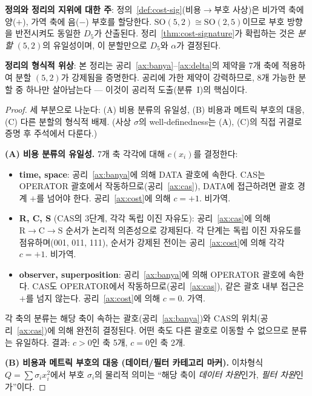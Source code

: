 \documentclass[entropy,article,submit,pdftex,oneauthor]{Definitions/mdpi}
\begin{document}
\textbf{정의와 정리의 지위에 대한 주}: 정의~\ref{def:cost-sig}(비용$\to$부호 사상)은 비가역 축에 양($+$), 가역 축에 음($-$) 부호를 할당한다. $\mathrm{SO}(5,2) \cong \mathrm{SO}(2,5)$이므로 부호 방향을 반전시켜도 동일한 $D_5$가 산출된다. 정리~\ref{thm:cost-signature}가 확립하는 것은 \emph{분할} $(5,2)$의 유일성이며, 이 분할만으로 $D_5$와 $\alpha$가 결정된다.

\textbf{정리의 형식적 위상}: 본 정리는 공리~\ref{ax:banya}--\ref{ax:delta}의 제약을 7개 축에 적용하여 분할 $(5,2)$가 강제됨을 증명한다. 공리에 가한 제약이 강력하므로, 8개 가능한 분할 중 하나만 살아남는다 --- 이것이 공리적 도출(분류~I)의 핵심이다.

\begin{proof}
세 부분으로 나눈다: (A) 비용 분류의 유일성, (B) 비용과 메트릭 부호의 대응, (C) 다른 분할의 형식적 배제. (사상 $\sigma$의 well-definedness는 (A), (C)의 직접 귀결로 증명 후 주석에서 다룬다.)

\textbf{(A) 비용 분류의 유일성.} 7개 축 각각에 대해 $c(x_i)$를 결정한다:
\begin{itemize}
\item \textbf{time, space}: 공리~\ref{ax:banya}에 의해 DATA 괄호에 속한다. CAS는 OPERATOR 괄호에서 작동하므로(공리~\ref{ax:cas}), DATA에 접근하려면 괄호 경계 $+$를 넘어야 한다. 공리~\ref{ax:cost}에 의해 $c = +1$. 비가역.
\item \textbf{R, C, S} (CAS의 3단계, 각각 독립 이진 자유도): 공리~\ref{ax:cas}에 의해 $\mathrm{R} \to \mathrm{C} \to \mathrm{S}$ 순서가 논리적 의존성으로 강제된다. 각 단계는 독립 이진 자유도를 점유하며(001, 011, 111), 순서가 강제된 전이는 공리~\ref{ax:cost}에 의해 각각 $c = +1$. 비가역.
\item \textbf{observer, superposition}: 공리~\ref{ax:banya}에 의해 OPERATOR 괄호에 속한다. CAS도 OPERATOR에서 작동하므로(공리~\ref{ax:cas}), 같은 괄호 내부 접근은 $+$를 넘지 않는다. 공리~\ref{ax:cost}에 의해 $c = 0$. 가역.
\end{itemize}
각 축의 분류는 해당 축이 속하는 괄호(공리~\ref{ax:banya})와 CAS의 위치(공리~\ref{ax:cas})에 의해 완전히 결정된다. 어떤 축도 다른 괄호로 이동할 수 없으므로 분류는 유일하다. 결과: $c > 0$인 축 5개, $c = 0$인 축 2개.

\textbf{(B) 비용과 메트릭 부호의 대응 (데이터/필터 카테고리 마커).} 이차형식 $Q = \sum \sigma_i x_i^2$에서 부호 $\sigma_i$의 물리적 의미는 ``해당 축이 \emph{데이터 차원}인가, \emph{필터 차원}인가''이다.


\end{proof}
\end{document}
